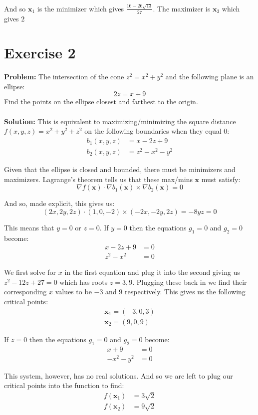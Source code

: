 \documentclass{article}
\begin{document}
And so $\mathbf x_1$ is the minimizer which gives $\frac{16-26\sqrt{13}}{27}$. The maximizer is $\mathbf x_3$ which gives $2$

\section*{Exercise 2}
\textbf{Problem:} The intersection of the cone $z^2=x^2+y^2$ and the following plane is an ellipse:
$$2z=x+9$$
Find the points on the ellipse closest and farthest to the origin.
\\\\
\textbf{Solution:} This is equivalent to maximizing/minimizing the square distance $f(x,y,z)=x^2+y^2+z^2$ on the following boundaries when they equal 0:
\begin{align*}
  b_1(x,y,z)&=x-2z+9\\
  b_2(x,y,z)&=z^2-x^2-y^2
\end{align*}

Given that the ellipse is closed and bounded, there must be minimizers and maximizers. Lagrange's theorem tells us that these max/mins $\mathbf x$ must satisfy:
$$\nabla f(\mathbf x)\cdot\nabla b_1(\mathbf x)\times\nabla b_2(\mathbf x)=0$$

And so, made explicit, this gives us:
$$(2x,2y,2z)\cdot(1,0,-2)\times(-2x,-2y,2z)=-8yz=0$$

This means that $y=0$ or $z=0$. If $y=0$ then the equations $g_1=0$ and $g_2=0$ become:
\begin{align*}
  x-2z+9&=0\\
  z^2-x^2&=0
\end{align*}

We first solve for $x$ in the first equation and plug it into the second giving us $z^2-12z+27=0$ which has roots $z=3,9$. Plugging these back in we find their corresponding $x$ values to be $-3$ and $9$ respectively. This gives us the following critical points:
\begin{align*}
  \mathbf x_1=(-3,0,3)\\
  \mathbf x_2=(9,0,9)
\end{align*}

If $z=0$ then the equations $g_1=0$ and $g_2=0$ become:
\begin{align*}
  x+9&=0\\
  -x^2-y^2&=0
\end{align*}

This system, however, has no real solutions. And so we are left to plug our critical points into the function to find:
\begin{align*}
  f(\mathbf x_1)&=3\sqrt 2\\
  f(\mathbf x_2)&=9\sqrt 2
\end{align*}
\end{document}
